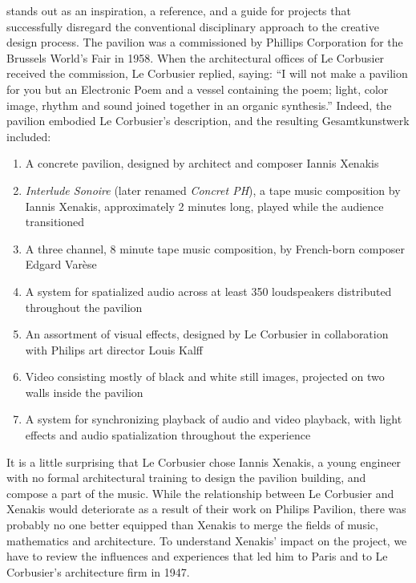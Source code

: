 \documentclass{tufte-book}
\begin{document}
 stands out as an inspiration, a
reference, and a guide for projects that successfully disregard the
conventional disciplinary approach to the creative design process. The
pavilion was a commissioned by Phillips Corporation for the Brussels
World's Fair in 1958.\cite{Zvonar1999a} When the architectural offices of
Le Corbusier received the commission, Le Corbusier replied, saying:
``I will not make a pavilion for you but an Electronic Poem and a
vessel containing the poem; light, color image, rhythm and sound
joined together in an organic synthesis.''\cite{Lopez2011} Indeed,
the pavilion embodied Le Corbusier's description, and the resulting
Gesamtkunstwerk included:\cite{Lombardo2009}
\begin{enumerate}
\item A concrete pavilion, designed by architect and composer Iannis
  Xenakis
\item \textit{Interlude Sonoire} (later renamed \textit{Concret PH}), a
  tape music composition by Iannis Xenakis, approximately 2 minutes
  long, played while the audience transitioned
\item A three channel, 8 minute tape music composition, by French-born
  composer Edgard Var\`{e}se
\item A system for spatialized audio across at least 350 loudspeakers
  distributed throughout the pavilion
\item An assortment of visual effects, designed by Le Corbusier in
  collaboration with Philips art director Louis Kalff
\item Video consisting mostly of black and white still images,
  projected on two walls inside the pavilion
\item A system for synchronizing playback of audio and video playback,
  with light effects and audio spatialization throughout the
  experience
\end{enumerate} 

It is a little surprising that Le Corbusier chose Iannis Xenakis, a
young engineer with no formal architectural training to design the
pavilion building, and compose a part of the music. While the
relationship between Le Corbusier and Xenakis would deteriorate as a
result of their work on Philips Pavilion, there was probably no one
better equipped than Xenakis to merge the fields of music, mathematics
and architecture. To understand Xenakis' impact on the project, we
have to review the influences and experiences that led him to Paris
and to Le Corbusier's architecture firm in 1947.
\end{document}
